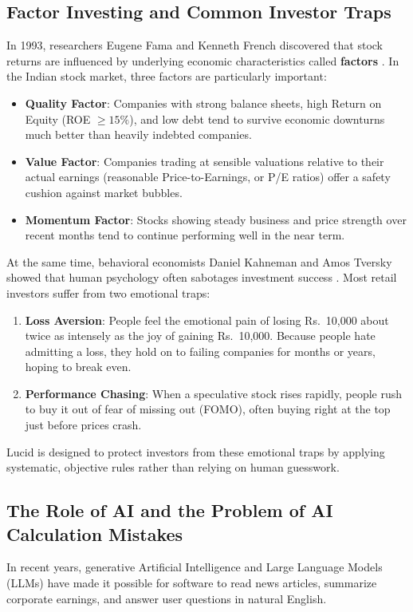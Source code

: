 \subsection{Factor Investing and Common Investor Traps}
In 1993, researchers Eugene Fama and Kenneth French discovered that stock returns are influenced by underlying economic characteristics called \textbf{factors} \cite{fama1993}. In the Indian stock market, three factors are particularly important:
\begin{itemize}
    \item \textbf{Quality Factor}: Companies with strong balance sheets, high Return on Equity (ROE $\ge 15\%$), and low debt tend to survive economic downturns much better than heavily indebted companies.
    \item \textbf{Value Factor}: Companies trading at sensible valuations relative to their actual earnings (reasonable Price-to-Earnings, or P/E ratios) offer a safety cushion against market bubbles.
    \item \textbf{Momentum Factor}: Stocks showing steady business and price strength over recent months tend to continue performing well in the near term.
\end{itemize}

At the same time, behavioral economists Daniel Kahneman and Amos Tversky showed that human psychology often sabotages investment success \cite{kahneman1979}. Most retail investors suffer from two emotional traps:
\begin{enumerate}
    \item \textbf{Loss Aversion}: People feel the emotional pain of losing Rs.~10,000 about twice as intensely as the joy of gaining Rs.~10,000. Because people hate admitting a loss, they hold on to failing companies for months or years, hoping to break even.
    \item \textbf{Performance Chasing}: When a speculative stock rises rapidly, people rush to buy it out of fear of missing out (FOMO), often buying right at the top just before prices crash.
\end{enumerate}

Lucid is designed to protect investors from these emotional traps by applying systematic, objective rules rather than relying on human guesswork.

\subsection{The Role of AI and the Problem of AI Calculation Mistakes}
In recent years, generative Artificial Intelligence and Large Language Models (LLMs) have made it possible for software to read news articles, summarize corporate earnings, and answer user questions in natural English.

